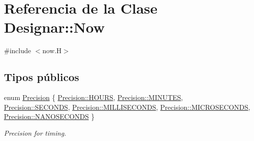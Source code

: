 \hypertarget{class_designar_1_1_now}{}\section{Referencia de la Clase Designar\+:\+:Now}
\label{class_designar_1_1_now}


{\ttfamily \#include $<$now.\+H$>$}

\subsection*{Tipos públicos}
\begin{DoxyCompactItemize}
\item 
enum \hyperlink{class_designar_1_1_now_a3c9f5e57907c88cbe63c70a64638c072}{Precision} \{ \newline
\hyperlink{class_designar_1_1_now_a3c9f5e57907c88cbe63c70a64638c072a5ab9376a7869a83e84e94bcb25aa8cbd}{Precision\+::\+H\+O\+U\+RS}, 
\hyperlink{class_designar_1_1_now_a3c9f5e57907c88cbe63c70a64638c072a7ffb9cea885bcba59e55574d54f819c2}{Precision\+::\+M\+I\+N\+U\+T\+ES}, 
\hyperlink{class_designar_1_1_now_a3c9f5e57907c88cbe63c70a64638c072aa9126caa6ef3db9cf3c35ac627ad22b5}{Precision\+::\+S\+E\+C\+O\+N\+DS}, 
\hyperlink{class_designar_1_1_now_a3c9f5e57907c88cbe63c70a64638c072ab4fd5e5c06e72437a57379576df36936}{Precision\+::\+M\+I\+L\+L\+I\+S\+E\+C\+O\+N\+DS}, 
\newline
\hyperlink{class_designar_1_1_now_a3c9f5e57907c88cbe63c70a64638c072a98a5b3971201a65b35d420793d7148ea}{Precision\+::\+M\+I\+C\+R\+O\+S\+E\+C\+O\+N\+DS}, 
\hyperlink{class_designar_1_1_now_a3c9f5e57907c88cbe63c70a64638c072a5b3b43ddfdecac6712fd1dbc20798e6b}{Precision\+::\+N\+A\+N\+O\+S\+E\+C\+O\+N\+DS}
 \}\begin{DoxyCompactList}\small\item\em Precision for timing. \end{DoxyCompactList}
\end{DoxyCompactItemize}
